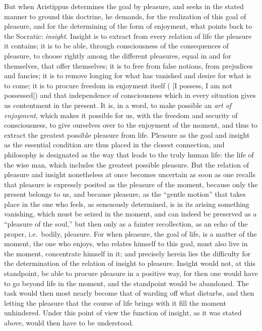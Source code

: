 But when Aristippus determines the goal by pleasure, and
seeks in the stated manner to ground this doctrine, he
demands, for the realization of this goal of pleasure, and for
the determining of the form of enjoyment, what points back to the
Socratic: \emph{insight}. Insight is to extract from every relation of life
the pleasure it contains; it is to be able, through consciousness
of the consequences of pleasure, to choose rightly among the different pleasures,
equal in and for themselves, that offer themselves; it is to free from false
notions, from prejudices and fancies; it is to remove
longing for what has vanished and desire for what is to come; it is to procure freedom in enjoyment itself (
 [I possess, I am not possessed]) and that independence of consciousness which in every situation gives us contentment in the present. It is, in
a word, to make possible an \emph{art of enjoyment}, which makes it
possible for us, with the freedom and security of consciousness, to give ourselves over
to the enjoyment of the moment, and thus to extract the greatest
possible pleasure from life. Pleasure as the goal and insight as
the essential condition are thus placed in the closest
connection, and philosophy is designated as the way that leads
to the truly human life: the life of the wise man, which includes the greatest possible pleasure. But the relation of pleasure and insight
nonetheless at once becomes uncertain as soon as one recalls that
pleasure is expressly posited as the pleasure of the moment, because only the
present belongs to us, and because pleasure, as the ``gentle motion'' that takes place in the one who feels, as sensuously
determined, is in its arising something vanishing, which must be seized
in the moment, and can indeed be preserved as a ``pleasure of the soul,'' but
then only as a fainter recollection, as an echo of the
proper, i.e.\ bodily, pleasure. For when pleasure, the goal of life,
is a matter of the moment, the one who enjoys, who relates himself
to this goal, must also live in the moment, concentrate himself in it;
and precisely herein lies the difficulty for the determination of the relation of insight to pleasure. Insight would not, at this standpoint, be able to procure
pleasure in a positive way, for
then one would have to go beyond life in the moment, and
the standpoint would be abandoned. The task would then most nearly
become that of warding off what disturbs, and then letting the
pleasure that the course of life brings with it fill the moment unhindered. Under this point of view the function of insight, as it was stated above, would then have to be understood.
